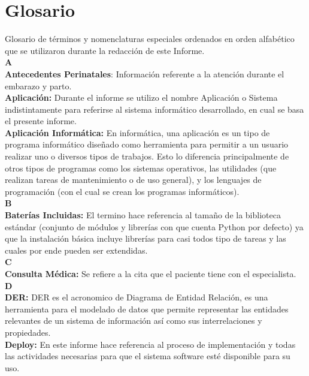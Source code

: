 ﻿\chapter*{Glosario}


Glosario de términos y nomenclaturas especiales ordenados en orden alfabético que se utilizaron durante la redacción de este Informe.
\\[0.1cm]

{\LARGE \textbf{A}}\\[0.1cm]

\textbf{Antecedentes Perinatales}: Información referente a la atención durante el embarazo y parto.\\[0.1cm]

\textbf{Aplicación:} Durante el informe se utilizo el nombre Aplicación o Sistema indistintamente para referirse al sistema informático desarrollado, en cual se basa el presente informe.
\\[0.1cm]

\textbf{Aplicación Informática:} En informática, una aplicación es un tipo de programa informático dise\~nado como herramienta para permitir a un usuario realizar uno o diversos tipos de trabajos. Esto lo diferencia principalmente de otros tipos de programas como los sistemas operativos, las utilidades (que realizan tareas de mantenimiento o de uso general), y los lenguajes de programación (con el cual se crean los programas informáticos).
\\[0.5cm]

{\LARGE \textbf{B}}
\\[0.1cm]
\textbf{Baterías Incluidas:} El termino hace referencia al tama\~no de la biblioteca estándar (conjunto de módulos y librerías con que cuenta Python por defecto) ya que la instalación básica incluye librerías para casi todos tipo de tareas y las cuales por ende pueden ser extendidas.
\\[0.5cm]

{\LARGE \textbf{C}}
\\[0.1cm]
\textbf{Consulta Médica:} 
Se refiere a la cita que el paciente tiene con el especialista.
\\[0.5cm]

{\LARGE \textbf{D}}
\\[0.1cm]
\textbf{DER:} DER es el acronomico de Diagrama de Entidad Relación, es una herramienta para el modelado de datos que permite representar las entidades relevantes de un sistema de información así como sus interrelaciones y propiedades.
\\[0.1cm]
\textbf{Deploy:}
En este informe hace referencia al proceso de implementación y todas las actividades necesarias para que el sistema software esté disponible para su uso.
\\[0.5cm]

